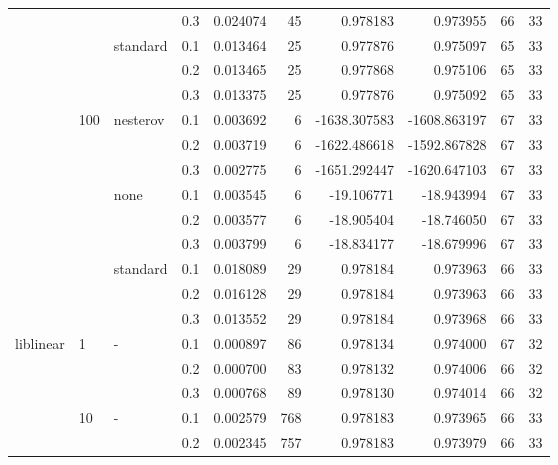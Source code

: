 \begin{table}[h!]
\begin{tabular}{llllrrrrrr}
          &     &   & 0.3 &  0.024074 &      45 &     0.978183 &     0.973955 &          66 &        33 \\
          &     & standard & 0.1 &  0.013464 &      25 &     0.977876 &     0.975097 &          65 &        33 \\
          &     &   & 0.2 &  0.013465 &      25 &     0.977868 &     0.975106 &          65 &        33 \\
          &     &   & 0.3 &  0.013375 &      25 &     0.977876 &     0.975092 &          65 &        33 \\
          & 100 & nesterov & 0.1 &  0.003692 &       6 & -1638.307583 & -1608.863197 &          67 &        33 \\
          &     &   & 0.2 &  0.003719 &       6 & -1622.486618 & -1592.867828 &          67 &        33 \\
          &     &   & 0.3 &  0.002775 &       6 & -1651.292447 & -1620.647103 &          67 &        33 \\
          &     & none & 0.1 &  0.003545 &       6 &   -19.106771 &   -18.943994 &          67 &        33 \\
          &     &   & 0.2 &  0.003577 &       6 &   -18.905404 &   -18.746050 &          67 &        33 \\
          &     &   & 0.3 &  0.003799 &       6 &   -18.834177 &   -18.679996 &          67 &        33 \\
          &     & standard & 0.1 &  0.018089 &      29 &     0.978184 &     0.973963 &          66 &        33 \\
          &     &   & 0.2 &  0.016128 &      29 &     0.978184 &     0.973963 &          66 &        33 \\
          &     &   & 0.3 &  0.013552 &      29 &     0.978184 &     0.973968 &          66 &        33 \\
liblinear & 1   & - & 0.1 &  0.000897 &      86 &     0.978134 &     0.974000 &          67 &        32 \\
          &     &   & 0.2 &  0.000700 &      83 &     0.978132 &     0.974006 &          66 &        32 \\
          &     &   & 0.3 &  0.000768 &      89 &     0.978130 &     0.974014 &          66 &        32 \\
          & 10  & - & 0.1 &  0.002579 &     768 &     0.978183 &     0.973965 &          66 &        33 \\
          &     &   & 0.2 &  0.002345 &     757 &     0.978183 &     0.973979 &          66 &        33 \\

\end{tabular}
\end{table}
